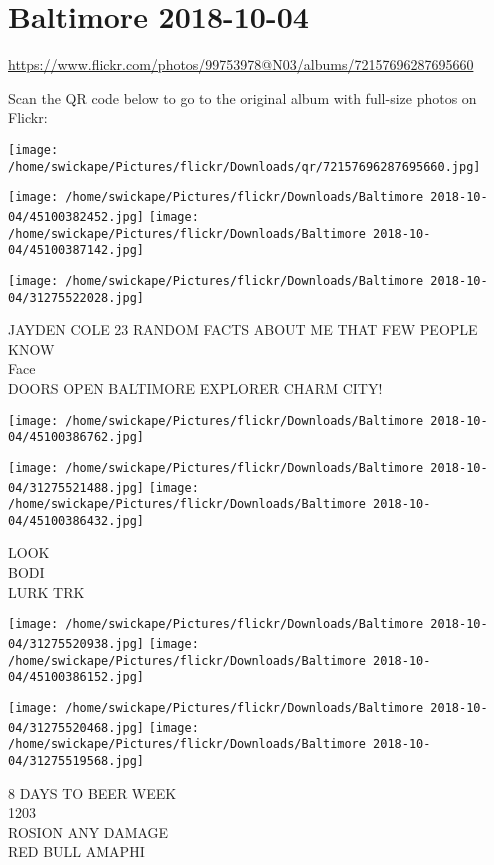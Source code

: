 \documentclass[10pt,letterpaper]{article}
\title{}
\author{}
\date{}
\begin{document}
\section*{Baltimore 2018-10-04}

\url{https://www.flickr.com/photos/99753978@N03/albums/72157696287695660}

Scan the QR code below to go to the original album with full-size photos on Flickr:

\texttt{[image: /home/swickape/Pictures/flickr/Downloads/qr/72157696287695660.jpg]}
\pagebreak

\texttt{[image: /home/swickape/Pictures/flickr/Downloads/Baltimore 2018-10-04/45100382452.jpg]}
\texttt{[image: /home/swickape/Pictures/flickr/Downloads/Baltimore 2018-10-04/45100387142.jpg]}

\texttt{[image: /home/swickape/Pictures/flickr/Downloads/Baltimore 2018-10-04/31275522028.jpg]}

JAYDEN COLE 23 RANDOM FACTS ABOUT ME THAT FEW PEOPLE KNOW\\
Face\\
DOORS OPEN BALTIMORE EXPLORER CHARM CITY!
\pagebreak

\texttt{[image: /home/swickape/Pictures/flickr/Downloads/Baltimore 2018-10-04/45100386762.jpg]}

\vspace{0.25in}
\texttt{[image: /home/swickape/Pictures/flickr/Downloads/Baltimore 2018-10-04/31275521488.jpg]}
\texttt{[image: /home/swickape/Pictures/flickr/Downloads/Baltimore 2018-10-04/45100386432.jpg]}

LOOK\\
BODI\\
LURK TRK
\pagebreak

\texttt{[image: /home/swickape/Pictures/flickr/Downloads/Baltimore 2018-10-04/31275520938.jpg]}
\texttt{[image: /home/swickape/Pictures/flickr/Downloads/Baltimore 2018-10-04/45100386152.jpg]}

\texttt{[image: /home/swickape/Pictures/flickr/Downloads/Baltimore 2018-10-04/31275520468.jpg]}
\texttt{[image: /home/swickape/Pictures/flickr/Downloads/Baltimore 2018-10-04/31275519568.jpg]}

8 DAYS TO BEER WEEK\\
1203\\
ROSION ANY DAMAGE\\
RED BULL AMAPHI
\pagebreak
\end{document}
